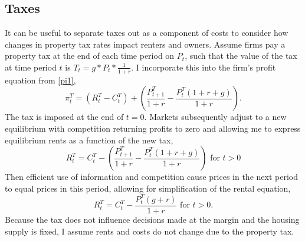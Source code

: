 \documentclass[ecta,nameyear,draft]{econsocart}
\theoremstyle{plain}
\theoremstyle{remark}
\begin{document}
\subsection{Taxes}
It can be useful to separate taxes out as a component of costs to consider how changes in property tax rates impact renters and owners. Assume firms pay a property tax at the end of each time period on $P_{t}$, such that the value of the tax at time period $t$ is $T_t=g*P_{t}*\frac{1}{1+r}$. I incorporate this into the firm's profit equation from \ref{pi1},
\begin{equation*}
	\pi^T_t = (R^T_t-C^T_t)+\left(\frac{P^T_{t+1}}{1+r}-\frac{P^T_t(1+r+g)}{1+r}\right).\label{pi1T}
\end{equation*}
The tax is imposed at the end of $t=0$. Markets subsequently adjust to a new equilibrium with competition returning profits to zero and allowing me to express equilibrium rents as a function of the new tax,
\begin{equation*}
	R^T_t=C^T_t-\left(\frac{P^T_{t+1}}{1+r}-\frac{P^T_t(1+r+g)}{1+r}\right) \text{ for }t>0
\end{equation*}
Then efficient use of information and competition cause prices in the next period to equal prices in this period, allowing for simplification of the rental equation,
\begin{equation*}
R^T_t=C^T_t-\frac{P^T_{t}(g+r)}{1+r}\text{ for }t>0.
\end{equation*}
Because the tax does not influence decisions made at the margin and the housing supply is fixed, I assume rents and costs do not change due to the property tax. 
\end{document}
